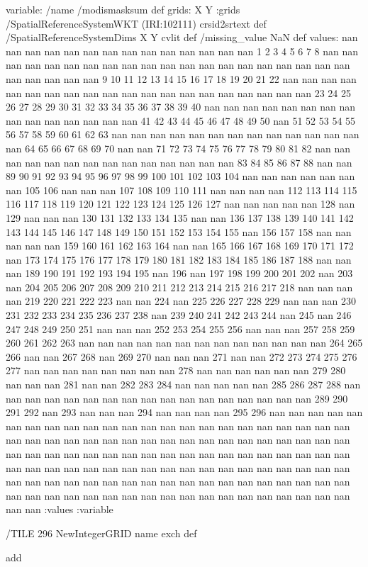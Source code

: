 \begin{ingrid}
variable:
/name /modismasksum def
grids: X Y :grids
/SpatialReferenceSystemWKT (IRI:102111) crsid2srtext def
/SpatialReferenceSystemDims { X Y } cvlit  def
/missing_value NaN def
values:
nan	nan	nan	nan	nan	nan	nan	nan	nan	nan	nan	nan	nan	nan	1	2	3	4	5	6	7	8	nan	nan	nan	nan	nan	nan	nan	nan	nan	nan	nan	nan	nan	nan	nan	nan	nan	nan	nan	nan	nan	nan	nan	nan	nan	9	10	11	12	13	14	15	16	17	18	19	20	21	22	nan	nan	nan	nan	nan	nan	nan	nan	nan	nan	nan	nan	nan	nan	nan	nan	nan	nan	nan	nan	23	24	25	26	27	28	29	30	31	32	33	34	35	36	37	38	39	40	nan	nan	nan	nan	nan	nan	nan	nan	nan	nan	nan	nan	nan	nan	nan	41	42	43	44	45	46	47	48	49	50	nan	51	52	53	54	55	56	57	58	59	60	61	62	63	nan	nan	nan	nan	nan	nan	nan	nan	nan	nan	nan	nan	nan	nan	64	65	66	67	68	69	70	nan	nan	71	72	73	74	75	76	77	78	79	80	81	82	nan	nan	nan	nan	nan	nan	nan	nan	nan	nan	nan	nan	nan	nan	83	84	85	86	87	88	nan	nan	89	90	91	92	93	94	95	96	97	98	99	100	101	102	103	104	nan	nan	nan	nan	nan	nan	nan	105	106	nan	nan	nan	107	108	109	110	111	nan	nan	nan	nan	112	113	114	115	116	117	118	119	120	121	122	123	124	125	126	127	nan	nan	nan	nan	nan	128	nan	129	nan	nan	nan	130	131	132	133	134	135	nan	nan	136	137	138	139	140	141	142	143	144	145	146	147	148	149	150	151	152	153	154	155	nan	156	157	158	nan	nan	nan	nan	nan	159	160	161	162	163	164	nan	nan	165	166	167	168	169	170	171	172	nan	173	174	175	176	177	178	179	180	181	182	183	184	185	186	187	188	nan	nan	nan	189	190	191	192	193	194	195	nan	196	nan	197	198	199	200	201	202	nan	203	nan	204	205	206	207	208	209	210	211	212	213	214	215	216	217	218	nan	nan	nan	nan	219	220	221	222	223	nan	nan	224	nan	225	226	227	228	229	nan	nan	nan	230	231	232	233	234	235	236	237	238	nan	239	240	241	242	243	244	nan	245	nan	246	247	248	249	250	251	nan	nan	nan	252	253	254	255	256	nan	nan	nan	257	258	259	260	261	262	263	nan	nan	nan	nan	nan	nan	nan	nan	nan	nan	nan	nan	nan	264	265	266	nan	nan	267	268	nan	269	270	nan	nan	nan	271	nan	nan	272	273	274	275	276	277	nan	nan	nan	nan	nan	nan	nan	nan	278	nan	nan	nan	nan	nan	nan	279	280	nan	nan	nan	281	nan	nan	282	283	284	nan	nan	nan	nan	nan	285	286	287	288	nan	nan	nan	nan	nan	nan	nan	nan	nan	nan	nan	nan	nan	nan	nan	nan	nan	289	290	291	292	nan	293	nan	nan	nan	294	nan	nan	nan	nan	295	296	nan	nan	nan	nan	nan	nan	nan	nan	nan	nan	nan	nan	nan	nan	nan	nan	nan	nan	nan	nan	nan	nan	nan	nan	nan	nan	nan	nan	nan	nan	nan	nan	nan	nan	nan	nan	nan	nan	nan	nan	nan	nan	nan	nan	nan	nan	nan	nan	nan	nan	nan	nan	nan	nan	nan	nan	nan	nan	nan	nan	nan	nan	nan	nan	nan	nan	nan	nan	nan	nan	nan	nan	nan	nan	nan	nan	nan	nan	nan	nan	nan	nan	nan	nan	nan	nan	nan	nan	nan	nan	nan	nan	nan	nan	nan	nan	nan	nan	nan	nan	nan	nan	nan	nan	nan	nan	nan	nan	nan	nan	nan	nan	nan	nan	nan
:values
:variable



/TILE 296 NewIntegerGRID
name exch def
\end{ingrid}
add

